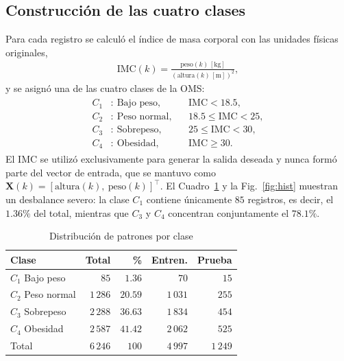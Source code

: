 \documentclass[conference]{IEEEtran}
\begin{document}
\subsection{Construcción de las cuatro clases}
Para cada registro se calculó el índice de masa corporal con las unidades
físicas originales,
\begin{align}
    \label{eq:imc}
    \text{IMC}(k)=\frac{\text{peso}(k)\,[\text{kg}]}{\left(\text{altura}(k)\,[\text{m}]\right)^2},
\end{align}
y se asignó una de las cuatro clases de la OMS:
\begin{align}
    \label{eq:clases}
    \begin{aligned}
    C_1&:\ \text{Bajo peso}, &&\text{IMC}<18.5,\\
    C_2&:\ \text{Peso normal}, &&18.5\leq\text{IMC}<25,\\
    C_3&:\ \text{Sobrepeso}, &&25\leq\text{IMC}<30,\\
    C_4&:\ \text{Obesidad}, &&\text{IMC}\geq30.
    \end{aligned}
\end{align}
El IMC se utilizó exclusivamente para generar la salida deseada y nunca
formó parte del vector de entrada, que se mantuvo como
$\mathbf{X}(k)=[\text{altura}(k),\ \text{peso}(k)]^\top$. El
Cuadro~\ref{tab:clases} y la Fig.~\ref{fig:hist} muestran un desbalance
severo: la clase $C_1$ contiene únicamente $85$ registros, es decir, el
$1.36\%$ del total, mientras que $C_3$ y $C_4$ concentran conjuntamente el
$78.1\%$.

\begin{table}[htbp]
\caption{Distribución de patrones por clase}
\label{tab:clases}
\begin{center}
\begin{tabular}{lrrrr}
\toprule
\textbf{Clase} & \textbf{Total} & \textbf{\%} & \textbf{Entren.} & \textbf{Prueba} \\
\midrule
$C_1$ Bajo peso   & $85$     & $1.36$  & $70$     & $15$  \\
$C_2$ Peso normal & $1\,286$ & $20.59$ & $1\,031$ & $255$ \\
$C_3$ Sobrepeso   & $2\,288$ & $36.63$ & $1\,834$ & $454$ \\
$C_4$ Obesidad    & $2\,587$ & $41.42$ & $2\,062$ & $525$ \\
\midrule
Total             & $6\,246$ & $100$   & $4\,997$ & $1\,249$ \\
\bottomrule
\end{tabular}
\end{center}
\end{table}
\end{document}
